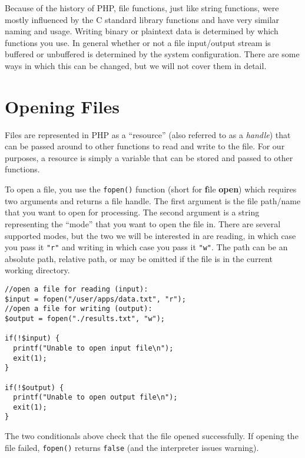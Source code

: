 

Because of the history of PHP, file functions, 
just like string functions, were mostly influenced
by the C standard library functions and have
very similar naming and usage.  Writing
binary or plaintext data is determined by which
functions you use. In general whether or not a file input/output
stream is buffered or unbuffered is determined by
the system configuration.  There are some ways
in which this can be changed, but we will not 
cover them in detail.

\section{Opening Files}

Files are represented in PHP as a ``resource'' (also 
referred to as a \emph{handle}) that
can be passed around to other functions to read and
write to the file.  For our purposes, a resource is
simply a variable that can be stored and passed
to other functions.  

To open a file, you use the \texttt{fopen()} 
function (short for \textbf{f}ile \textbf{open}) which
requires two arguments and returns a file handle.
The first argument is the file path/name that you want
to open for processing.  The second argument is a
string representing the ``mode'' that you want to open the
file in.  There are several supported modes, but the two 
we will be interested in are reading, in which case you
pass it \texttt{"r"} and writing in which case you
pass it \texttt{"w"}.  The path can be an absolute 
path, relative path, or may be omitted if the file is in the
current working directory.

\begin{verbatim}
//open a file for reading (input):
$input = fopen("/user/apps/data.txt", "r");
//open a file for writing (output):
$output = fopen("./results.txt", "w");

if(!$input) {
  printf("Unable to open input file\n");
  exit(1);
}

if(!$output) {
  printf("Unable to open output file\n");
  exit(1);
}
\end{verbatim}

The two conditionals above check that the file opened successfully.
If opening the file failed, \texttt{fopen()} returns
\texttt{false} (and the interpreter issues  warning).  

